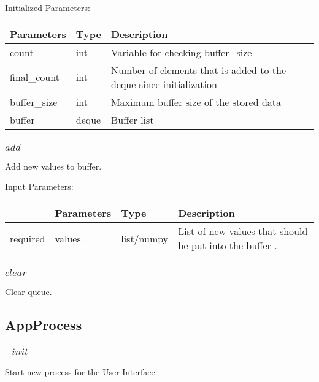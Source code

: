 \documentclass[
	ngerman,
	accentcolor=9c,%
	type=intern,
	marginpar=false
	]{tudapub}
\begin{document}
\vspace{0.5cm}
\noindent Initialized Parameters:
\vspace{0.5cm}

\begin{tabular}{|p{}| p{}| p{}|}
\hline
\textbf{Parameters} & \textbf{Type} & \textbf{Description} \\
\hline
count & int & Variable for checking buffer\_size \\
\hline
final\_count & int & Number of elements that is added to the deque since initialization \\
\hline
buffer\_size & int & Maximum buffer size of the stored data \\
\hline
buffer & deque & Buffer list \\
\hline
\end{tabular}
\vspace{1cm}

\subsubsection{$add$}
\noindent Add new values to buffer.


\vspace{0.5cm}
\noindent Input Parameters:
\vspace{0.5cm}

\begin{tabular}{|p{}|p{}|p{}| p{}|}
\hline
 & \textbf{Parameters} & \textbf{Type} & \textbf{Description} \\
\hline
required & values & list/numpy & List of new values that should be put into the buffer
. \\
\hline
\end{tabular}
\vspace{1cm}

\subsubsection{$clear$}
\noindent Clear queue.

\vspace{1cm}



\subsection{AppProcess}
\subsubsection{$\_\_init\_\_$}
\noindent Start new process for the User Interface
\end{document}
